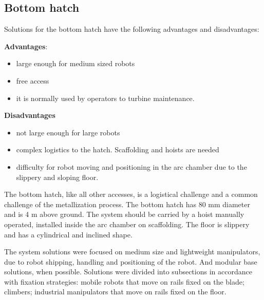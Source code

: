 \subsection{Bottom hatch}
Solutions for the bottom hatch have the following advantages and
disadvantages:

\textbf{Advantages}:
\begin{itemize}
  \item large enough for medium sized robots
  \item free access
  \item it is normally used by operators to turbine maintenance.
\end{itemize}

\textbf{Disadvantages}
\begin{itemize}
  \item not large enough for large robots
  \item complex logistics to the hatch. Scaffolding and hoists are
  needed
  \item difficulty for robot moving and positioning in the arc chamber due to
  the slippery and sloping floor.
\end{itemize}

The bottom hatch, like all other accesses, is a logistical challenge and
a common challenge of the metallization process. The bottom hatch has 80 mm
diameter and is 4 m above ground. The system should be carried by a hoist
manually operated, installed inside the arc chamber on scaffolding. The floor
is slippery and has a cylindrical and inclined shape.


The system solutions were focused on medium size and lightweight manipulators,
due to robot shipping, handling and positioning of the robot. And modular base
solutions, when possible. Solutions were divided into subsections in accordance
with fixation strategies: mobile robots that move on rails fixed on the blade;
climbers; industrial manipulators that move on rails fixed on the floor.

